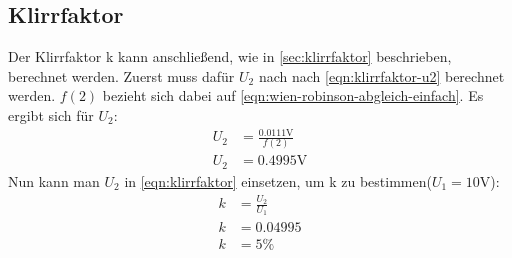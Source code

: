 \subsection{Klirrfaktor}
Der Klirrfaktor k kann anschließend, wie in \autoref{sec:klirrfaktor} beschrieben, berechnet werden. Zuerst muss dafür $U_2$ nach nach \autoref{eqn:klirrfaktor-u2} berechnet werden. $f(2)$ bezieht sich dabei auf \autoref{eqn:wien-robinson-abgleich-einfach}. Es ergibt sich für $U_2$:
\begin{align}
U_2&=\frac{0.0111\si{\volt}}{f(2)}\\
U_2&=0.4995\si{\volt}
\end{align}
Nun kann man $U_2$ in \autoref{eqn:klirrfaktor} einsetzen, um k zu bestimmen($U_1=10\si{\volt}$):
\begin{align}
  k&=\frac{U_2}{U_1}\\
  k&=0.04995\\
  k&=5\%
\end{align}
\newpage  
